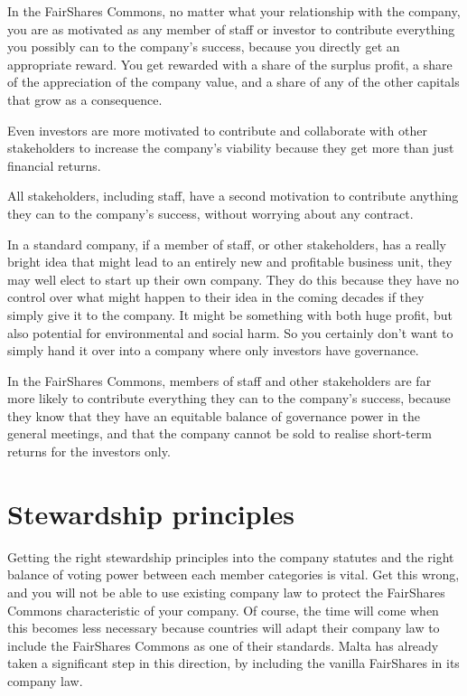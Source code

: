 In the FairShares Commons, no matter what your relationship with the company, you are as motivated as any member of staff or investor to contribute everything you possibly can to the company’s success, because you directly get an appropriate reward. You get rewarded with a share of the surplus profit, a share of the appreciation of the company value, and a share of any of the other capitals that grow as a consequence. 


Even investors are more motivated to contribute and collaborate with other stakeholders to increase the company’s viability because they get more than just financial returns.


All stakeholders,  including staff, have a second motivation to contribute anything they can to the company’s success, without worrying about any contract. 


In a standard company, if a member of staff, or other stakeholders, has a really bright idea that might lead to an entirely new and profitable business unit, they may well elect to start up their own company. They do this because they have no control over what might happen to their idea in the coming decades if they simply give it to the company. It might be something with both huge profit, but also potential for environmental and social harm. So you certainly don't want to simply hand it over into a company where only investors have governance.


In the FairShares Commons,  members of staff and other stakeholders are far more likely to contribute everything they can to the company’s success, because they know that they have an equitable balance of governance power in the general meetings, and that the company cannot be sold to realise short-term returns for the investors only.
\section{Stewardship principles}
Getting the right stewardship principles into the company statutes and the right balance of voting power between each member categories is vital. Get this wrong, and you will not be able to use existing company law to protect the FairShares Commons characteristic of your company. Of course, the time will come when this becomes less necessary because countries will adapt their company law to include the FairShares Commons as one of their standards. Malta has already taken a significant step in this direction, by including the vanilla FairShares in its company law.


